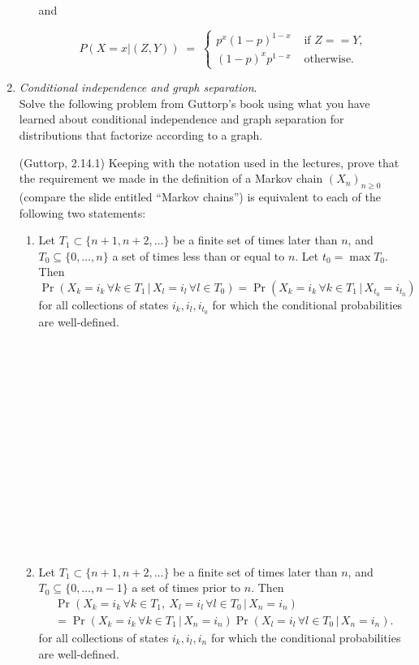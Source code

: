 \documentclass{article} %
\begin{document}
\begin{enumerate}
\begin{enumerate}
and

\[
P(X=x | (Z, Y)) \;=\;
\begin{cases}
  \displaystyle
  p^x (1-p)^{1-x} &\text{ if } Z == Y,\\
  (1-p)^x p^{1-x} &\text{ otherwise}.
\end{cases}
\]

  \end{enumerate}

\item {\em Conditional independence and graph separation}.\\
  Solve the
  following problem from Guttorp's book using what you have learned
  about conditional independence and graph separation for
  distributions that factorize according to a graph.

   (Guttorp, 2.14.1) Keeping with the notation used in the lectures, prove that the requirement we made in the definition of a Markov chain $(X_n)_{n\ge 0}$ (compare the slide entitled ``Markov chains'') is equivalent to each of the following two statements:
\begin{enumerate}
\item
Let $T_1\subset\{n+1,n+2,\dots\}$ be a finite set of times later than $n$, and $T_0\subseteq\{0,\dots,n\}$ a set of times less than or equal to $n$.  Let $t_0=\max T_0$.  Then
\[
\Pr(X_k=i_k\,\forall k\in T_1\,|\, X_l=i_l\,\forall l\in T_0)=\Pr(X_k=i_k\,\forall k\in T_1\,|\, X_{t_0}=i_{t_0})
\]
for all collections of states $i_k,i_l,i_{t_0}$ for which the conditional probabilities are well-defined.
~\\
~\\
~\\
~\\
~\\
~\\
~\\
~\\
~\\
~\\
~\\
~\\
~\\
~\\
~\\
\item
Let $T_1\subset\{n+1,n+2,\dots\}$ be a finite set of times later than $n$, and $T_0\subseteq\{0,\dots,n-1\}$ a set of times prior to $n$.   Then
\begin{multline*}
\Pr(X_k=i_k\,\forall k\in T_1,\: X_l=i_l\,\forall l\in T_0\,|\, X_n=i_n)\\
=\Pr(X_k=i_k\,\forall k\in T_1\,|\, X_n=i_n)\Pr(X_l=i_l\,\forall l\in T_0\,|\, X_n=i_n).
\end{multline*}
for all collections of states $i_k,i_l,i_n$ for which the conditional probabilities are well-defined.

\end{enumerate}


\end{enumerate}
\end{document}
